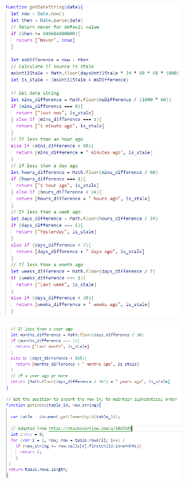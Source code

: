 \documentclass{l4proj}
\begin{document}
\begin{appendices}
 \begin{figure}[h]
\centering
\includegraphics[width=0.7\textwidth]{images/JS_code1.png}
\end{figure}

 \begin{figure}[h]
\centering
\includegraphics[width=0.7\textwidth]{images/JS_code2.png}
\end{figure}


\end{appendices}
\end{document}
